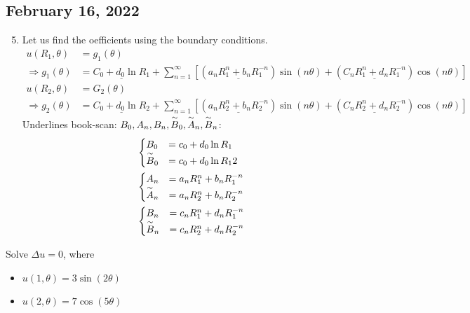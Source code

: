 \subsection*{February 16, 2022}
\begin{enumerate}
  \setcounter{enumi}{4}
  \item Let us find the oefficients using the boundary conditions.
  \begin{align}
    u(R_1, \theta) & = g_1(\theta)\\
    \Rightarrow g_1(\theta) & = \underline{C_0 + d_0 \ln R_1} +
    \sum^\infty_{n = 1}
    \left[
    (\underline{a_nR^n_1 + b_nR^{-n}_1}) \sin(n \theta) +
    (\underline{C_n R^n_1 + d_n R^{-n}_1}) \cos(n \theta)
    \right]\\
    u(R_2, \theta) & = G_2(\theta)\\
    \Rightarrow g_2(\theta) & = \underline{C_0 + d_0 \ln R_2} +
    \sum^\infty_{n = 1}
    \left[
    (\underline{a_n R^n_2 + b_n R^{-n}_2}) \sin(n \theta) +
    (\underline{C_n R^n_2 + d_n R^{-n}_2}) \cos(n \theta)
    \right]
  \end{align}
  Underlines book-scan: $B_0, A_n, B_n, \overset{\sim}{B}_0, \overset{\sim}{A}_n, \overset{\sim}{B}_n$:
  \begin{align}
    &
    \begin{cases}
      B_0 & = c_0 + d_0 \ln R_1\\
      \overset{\sim}{B}_0 & = c_0 + d_0 \ln R_12
    \end{cases}\\
    &
    \begin{cases}
                A_n & = a_n R^n_1 + b_nR^{-n}_1\\
      \overset{\sim}{A}_n & = a_n R^n_2 + b_nR^{-n}_2
    \end{cases}\\
    &
    \begin{cases}
               B_n & = c_n R^n_1 + d_n R^{-n}_1\\
      \overset{\sim}{B}_n & = c_n R^n_2 + d_n R^{-n}_2
    \end{cases}
  \end{align}
\end{enumerate}
\ex Solve $\Delta u = 0$, where
\begin{itemize}
  \item $u(1, \theta) = 3 \sin( 2 \theta )$
  \item $u(2, \theta) = 7 \cos( 5 \theta )$
\end{itemize}
%
